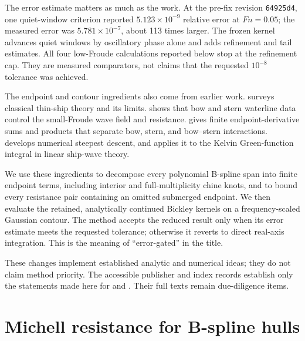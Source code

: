 \documentclass[10pt]{article}
\newcommand{\Fn}{\mathit{Fn}}
\begin{document}
The error estimate matters as much as the work.  At the pre-fix revision
\texttt{64925d4}, one quiet-window criterion reported
\(5.123\times10^{-9}\) relative error at \(\Fn=0.05\); the measured error was
\(5.781\times10^{-7}\), about 113 times larger.  The frozen kernel advances
quiet windows by oscillatory phase alone and adds refinement and tail
estimates.  All four low-Froude calculations reported below stop at the
refinement cap.  They are measured comparators, not claims that the requested
\(10^{-8}\) tolerance was achieved.

The endpoint and contour ingredients also come from earlier work.
\citet{Wehausen1973} surveys classical thin-ship theory and its limits.
\citet{KellerAhluwalia1976} shows that bow and stern waterline data control the
small-Froude wave field and resistance.  \citet[pp.~83--85]{Gotman2002} gives
finite endpoint-derivative sums and products that separate bow, stern, and
bow--stern interactions.  \citet{HuybrechsVandewalle2006} develops numerical
steepest descent, and \citet{Motygin2017} applies it to the Kelvin
Green-function integral in linear ship-wave theory.

We use these ingredients to decompose every polynomial B-spline span into
finite endpoint terms, including interior and full-multiplicity chine knots,
and to bound every resistance pair containing an omitted submerged endpoint.
We then evaluate the retained, analytically continued Bickley kernels on a
frequency-scaled Gaussian contour.  The method accepts the reduced result only
when its error estimate meets the requested tolerance; otherwise it reverts to
direct real-axis integration.  This is the meaning of ``error-gated'' in the
title.

These changes implement established analytic and numerical ideas; they do not
claim method priority.  The accessible publisher and index records establish
only the statements made here for \citet{Michelsen1972} and
\citet{SendagortaGrases1988}.  Their full texts remain due-diligence items.

\section{Michell resistance for B-spline hulls}
\label{sec:michell}
\end{document}
